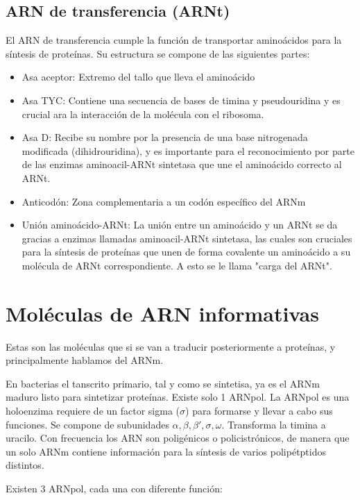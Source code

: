 \subsection{ARN de transferencia (ARNt)}

El ARN de transferencia cumple la función de transportar aminoácidos para la síntesis de proteínas. Su estructura se compone de las siguientes partes:

\begin{itemize}
    \item Asa aceptor: Extremo del tallo que lleva el aminoácido 
    \item Asa TYC: Contiene una secuencia de bases de timina y pseudouridina y es crucial ara la interacción de la molécula con el ribosoma.
    \item Asa D: Recibe su nombre por la presencia de una base nitrogenada modificada (dihidrouridina), y es importante para el reconocimiento por parte de las enzimas aminoacil-ARNt sintetasa que une el aminoácido correcto al ARNt.
    \item Anticodón: Zona complementaria a un codón específico del ARNm
    \item Unión aminoácido-ARNt: La unión entre un aminoácido y un ARNt se da gracias a enzimas llamadas aminoacil-ARNt sintetasa, las cuales son cruciales para la síntesis de proteínas que unen de forma covalente un aminoácido a su molécula de ARNt correspondiente. A esto se le llama "carga del ARNt".
\end{itemize}

\section{Moléculas de ARN informativas}

Estas son las moléculas que si se van a traducir posteriormente a proteínas, y principalmente hablamos del ARNm.

En bacterias el tanscrito primario, tal y como se sintetisa, ya es el ARNm maduro listo para sintetizar proteínas. Existe solo 1 ARNpol. La ARNpol es una holoenzima requiere de un factor sigma ($\sigma$) para formarse y llevar a cabo sus funciones. Se compone de subunidades $\alpha , \beta , \beta ' , \sigma , \omega$. Transforma la timina a uracilo. Con frecuencia los ARN son poligénicos o policistrónicos, de manera que un solo ARNm contiene información para la síntesis de varios polipétptidos distintos.

Existen 3 ARNpol, cada una con diferente función:

